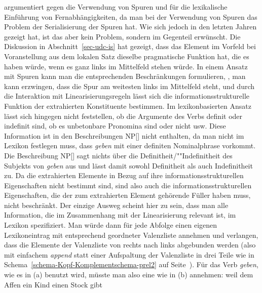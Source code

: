 \citet[--148]{Nerbonne94a} argumentiert gegen die Verwendung von Spuren und für
die lexikalische Einführung von Fernabhängigkeiten, da man bei der Verwendung von Spuren
das Problem der Serialisierung der Spuren hat. Wie sich jedoch in den letzten Jahren gezeigt hat,
ist das aber kein Problem, sondern im Gegenteil erwünscht.
Die Diskussion in Abschnitt~\ref{sec-udc-is} hat gezeigt, dass das Element im Vorfeld
bei Voranstellung aus dem lokalen Satz dieselbe pragmatische Funktion hat, die es
haben würde, wenn es ganz links im Mittelfeld stehen würde. In einem Ansatz mit Spuren kann
man die entsprechenden Beschränkungen formulieren, \dash, man kann erzwingen, dass die
Spur am weitesten links im Mittelfeld steht, und durch die Interaktion mit Linearisierungsregeln
lässt sich die informationsstrukturelle Funktion der extrahierten Konstituente bestimmen.
Im lexikonbasierten Ansatz lässt sich hingegen nicht feststellen, ob die Argumente
des Verbs definit oder indefinit sind, ob es unbetonbare Pronomina sind oder nicht usw.
Diese Information ist in den Beschreibungen NP[] nicht enthalten, da man nicht im
Lexikon festlegen muss, dass \emph{geben} mit einer definiten Nominalphrase vorkommt. Die Beschreibung
NP[] sagt nichts über die Definitheit/""Indefinitheit des Subjekts von \emph{geben} aus
und lässt damit sowohl Definitheit als auch Indefinitheit zu.
Da die extrahierten Elemente in Bezug auf ihre informationsstrukturellen Eigenschaften nicht
bestimmt sind, sind also auch die informationsstrukturellen Eigenschaften, die der zum extrahierten
Element gehörende Füller haben muss, nicht beschränkt.
Der einzige Ausweg scheint hier zu sein, dass man alle Information, die im Zusammenhang
mit der Linearisierung relevant ist, im Lexikon spezifiziert. Man würde dann für jede
Abfolge einen eigenen Lexikoneintrag mit entsprechend geordneter Valenzliste annehmen
und verlangen, dass die Elemente der Valenzliste von rechts nach links abgebunden werden
(also mit einfachem \emph{append} statt einer Aufspaltung der Valenzliste in drei Teile wie in
Schema~\ref{schema-Kopf-Komplementschema-prel2} auf
Seite~\pageref{schema-Kopf-Komplementschema-prel2}). Für das Verb \emph{geben}, wie es in (a) 
benutzt wird, müsste man also eine \compsl wie in (b) annehmen:
\eal
\ex weil dem Affen ein Kind einen Stock gibt
\ex {}
